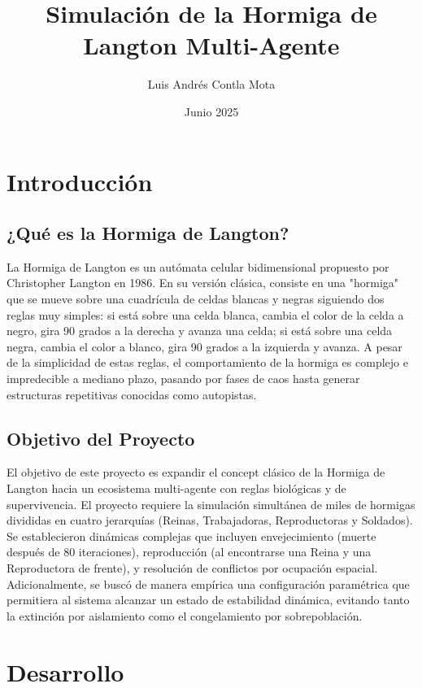 \documentclass[12pt,a4paper]{article}
\title{Simulación de la Hormiga de Langton Multi-Agente}
\author{Luis Andrés Contla Mota}
\date{Junio 2025}
\begin{document}
\renewcommand{\contentsname}{Índice}
\maketitle
\tableofcontents

\newpage

\section{Introducción}

\subsection{¿Qué es la Hormiga de Langton?}
La Hormiga de Langton es un autómata celular bidimensional propuesto por Christopher Langton en 1986. En su versión clásica, consiste en una "hormiga" que se mueve sobre una cuadrícula de celdas blancas y negras siguiendo dos reglas muy simples: si está sobre una celda blanca, cambia el color de la celda a negro, gira 90 grados a la derecha y avanza una celda; si está sobre una celda negra, cambia el color a blanco, gira 90 grados a la izquierda y avanza. A pesar de la simplicidad de estas reglas, el comportamiento de la hormiga es complejo e impredecible a mediano plazo, pasando por fases de caos hasta generar estructuras repetitivas conocidas como autopistas.

\subsection{Objetivo del Proyecto}
El objetivo de este proyecto es expandir el concept clásico de la Hormiga de Langton hacia un ecosistema multi-agente con reglas biológicas y de supervivencia. El proyecto requiere la simulación simultánea de miles de hormigas divididas en cuatro jerarquías (Reinas, Trabajadoras, Reproductoras y Soldados). Se establecieron dinámicas complejas que incluyen envejecimiento (muerte después de 80 iteraciones), reproducción (al encontrarse una Reina y una Reproductora de frente), y resolución de conflictos por ocupación espacial. Adicionalmente, se buscó de manera empírica una configuración paramétrica que permitiera al sistema alcanzar un estado de estabilidad dinámica, evitando tanto la extinción por aislamiento como el congelamiento por sobrepoblación.

\section{Desarrollo}
\end{document}

